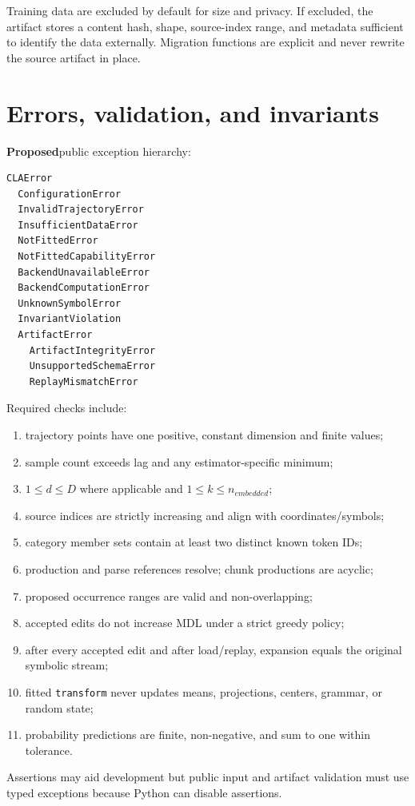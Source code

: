 \documentclass[11pt]{article}
\newcommand{\Proposed}{\textbf{Proposed}}
\begin{document}
Training data are excluded by default for size and privacy. If excluded, the
artifact stores a content hash, shape, source-index range, and metadata sufficient
to identify the data externally. Migration functions are explicit and never
rewrite the source artifact in place.

\section{Errors, validation, and invariants}

\Proposed public exception hierarchy:
\begin{verbatim}
CLAError
  ConfigurationError
  InvalidTrajectoryError
  InsufficientDataError
  NotFittedError
  NotFittedCapabilityError
  BackendUnavailableError
  BackendComputationError
  UnknownSymbolError
  InvariantViolation
  ArtifactError
    ArtifactIntegrityError
    UnsupportedSchemaError
    ReplayMismatchError
\end{verbatim}

Required checks include:
\begin{enumerate}[nosep]
\item trajectory points have one positive, constant dimension and finite values;
\item sample count exceeds lag and any estimator-specific minimum;
\item $1\leq d\leq D$ where applicable and $1\leq k\leq n_{embedded}$;
\item source indices are strictly increasing and align with coordinates/symbols;
\item category member sets contain at least two distinct known token IDs;
\item production and parse references resolve; chunk productions are acyclic;
\item proposed occurrence ranges are valid and non-overlapping;
\item accepted edits do not increase MDL under a strict greedy policy;
\item after every accepted edit and after load/replay, expansion equals the
  original symbolic stream;
\item fitted \texttt{transform} never updates means, projections, centers,
  grammar, or random state;
\item probability predictions are finite, non-negative, and sum to one within
  tolerance.
\end{enumerate}

Assertions may aid development but public input and artifact validation must use
typed exceptions because Python can disable assertions.
\end{document}
